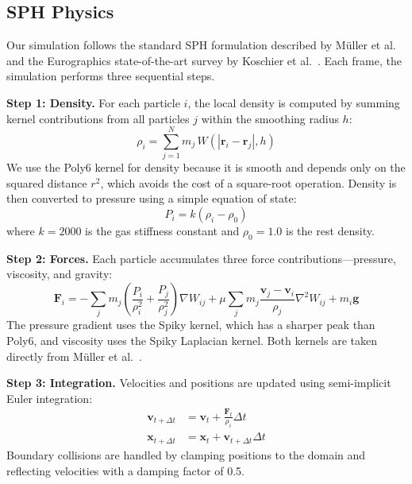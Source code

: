 \documentclass[12pt, a4paper]{article}
\begin{document}
\subsection{SPH Physics}
Our simulation follows the standard SPH formulation described by M\"uller et al.\ \cite{muller2003particle} and the Eurographics state-of-the-art survey by Koschier et al.\ \cite{koschier2014sph}. Each frame, the simulation performs three sequential steps.

\textbf{Step 1: Density.} For each particle $i$, the local density is computed by summing kernel contributions from all particles $j$ within the smoothing radius $h$:
\begin{equation}
\rho_i = \sum_{j=1}^{N} m_j \, W(|\mathbf{r}_i - \mathbf{r}_j|, h)
\end{equation}
We use the Poly6 kernel for density because it is smooth and depends only on the squared distance $r^2$, which avoids the cost of a square-root operation. Density is then converted to pressure using a simple equation of state:
\begin{equation}
P_i = k(\rho_i - \rho_0)
\end{equation}
where $k = 2000$ is the gas stiffness constant and $\rho_0 = 1.0$ is the rest density.

\textbf{Step 2: Forces.} Each particle accumulates three force contributions---pressure, viscosity, and gravity:
\begin{equation}
\mathbf{F}_i = -\sum_{j} m_j \left( \frac{P_i}{\rho_i^2} + \frac{P_j}{\rho_j^2} \right) \nabla W_{ij} + \mu \sum_{j} m_j \frac{\mathbf{v}_j - \mathbf{v}_i}{\rho_j} \nabla^2 W_{ij} + m_i \mathbf{g}
\end{equation}
The pressure gradient uses the Spiky kernel, which has a sharper peak than Poly6, and viscosity uses the Spiky Laplacian kernel. Both kernels are taken directly from M\"uller et al.\ \cite{muller2003particle}.

\textbf{Step 3: Integration.} Velocities and positions are updated using semi-implicit Euler integration:
\begin{align}
\mathbf{v}_{t+\Delta t} &= \mathbf{v}_t + \frac{\mathbf{F}_t}{\rho_i} \Delta t \\
\mathbf{x}_{t+\Delta t} &= \mathbf{x}_t + \mathbf{v}_{t+\Delta t} \Delta t
\end{align}
Boundary collisions are handled by clamping positions to the domain and reflecting velocities with a damping factor of 0.5.
\end{document}
